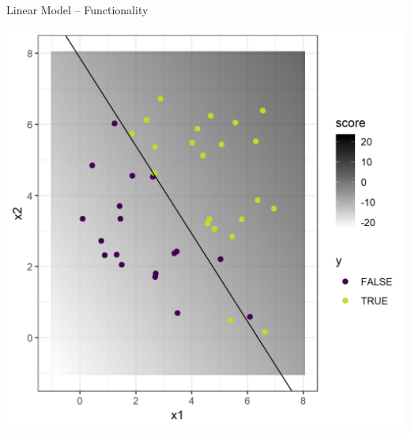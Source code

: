 \documentclass[11pt,compress,t,notes=noshow, xcolor=table]{beamer}
\begin{document}
\begin{frame}{Linear Model -- Functionality}
\begin{minipage}{0.42\textwidth}
\begin{center}
  \end{center}
\end{minipage}
\begin{minipage}{0.22\textwidth}
  \includegraphics[width=\textwidth]{figure/logreg-2vars-data.png}
\end{minipage}

\end{frame}

\end{document}
